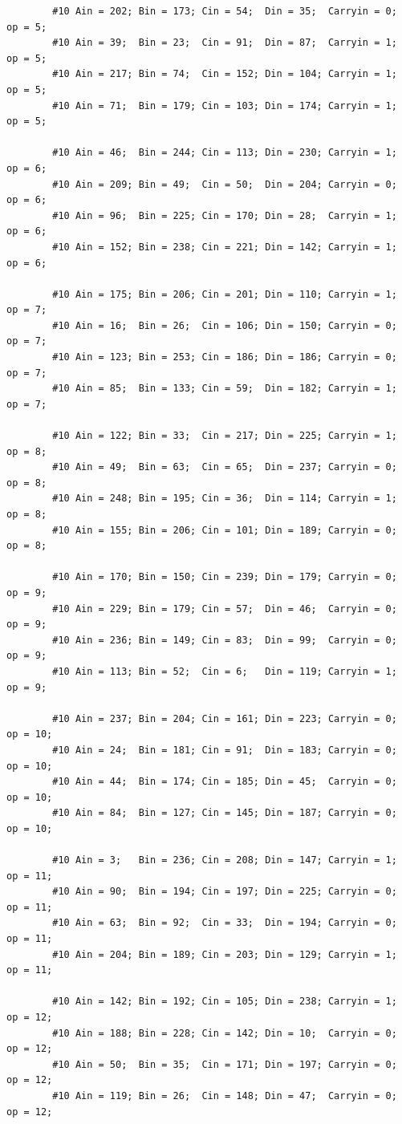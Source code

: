 \documentclass[12pt]{jreport}
\begin{document}
\begin{center}
\begin{lstlisting}
        #10 Ain = 202; Bin = 173; Cin = 54;  Din = 35;  Carryin = 0; op = 5;
        #10 Ain = 39;  Bin = 23;  Cin = 91;  Din = 87;  Carryin = 1; op = 5;
        #10 Ain = 217; Bin = 74;  Cin = 152; Din = 104; Carryin = 1; op = 5;
        #10 Ain = 71;  Bin = 179; Cin = 103; Din = 174; Carryin = 1; op = 5;
  
        #10 Ain = 46;  Bin = 244; Cin = 113; Din = 230; Carryin = 1; op = 6;
        #10 Ain = 209; Bin = 49;  Cin = 50;  Din = 204; Carryin = 0; op = 6;
        #10 Ain = 96;  Bin = 225; Cin = 170; Din = 28;  Carryin = 1; op = 6;
        #10 Ain = 152; Bin = 238; Cin = 221; Din = 142; Carryin = 1; op = 6;
  
        #10 Ain = 175; Bin = 206; Cin = 201; Din = 110; Carryin = 1; op = 7;
        #10 Ain = 16;  Bin = 26;  Cin = 106; Din = 150; Carryin = 0; op = 7;
        #10 Ain = 123; Bin = 253; Cin = 186; Din = 186; Carryin = 0; op = 7;
        #10 Ain = 85;  Bin = 133; Cin = 59;  Din = 182; Carryin = 1; op = 7;
  
        #10 Ain = 122; Bin = 33;  Cin = 217; Din = 225; Carryin = 1; op = 8;
        #10 Ain = 49;  Bin = 63;  Cin = 65;  Din = 237; Carryin = 0; op = 8;
        #10 Ain = 248; Bin = 195; Cin = 36;  Din = 114; Carryin = 1; op = 8;
        #10 Ain = 155; Bin = 206; Cin = 101; Din = 189; Carryin = 0; op = 8;
  
        #10 Ain = 170; Bin = 150; Cin = 239; Din = 179; Carryin = 0; op = 9;
        #10 Ain = 229; Bin = 179; Cin = 57;  Din = 46;  Carryin = 0; op = 9;
        #10 Ain = 236; Bin = 149; Cin = 83;  Din = 99;  Carryin = 0; op = 9;
        #10 Ain = 113; Bin = 52;  Cin = 6;   Din = 119; Carryin = 1; op = 9;
  
        #10 Ain = 237; Bin = 204; Cin = 161; Din = 223; Carryin = 0; op = 10;
        #10 Ain = 24;  Bin = 181; Cin = 91;  Din = 183; Carryin = 0; op = 10;
        #10 Ain = 44;  Bin = 174; Cin = 185; Din = 45;  Carryin = 0; op = 10;
        #10 Ain = 84;  Bin = 127; Cin = 145; Din = 187; Carryin = 0; op = 10;
  
        #10 Ain = 3;   Bin = 236; Cin = 208; Din = 147; Carryin = 1; op = 11;
        #10 Ain = 90;  Bin = 194; Cin = 197; Din = 225; Carryin = 0; op = 11;
        #10 Ain = 63;  Bin = 92;  Cin = 33;  Din = 194; Carryin = 0; op = 11;
        #10 Ain = 204; Bin = 189; Cin = 203; Din = 129; Carryin = 1; op = 11;
  
        #10 Ain = 142; Bin = 192; Cin = 105; Din = 238; Carryin = 1; op = 12;
        #10 Ain = 188; Bin = 228; Cin = 142; Din = 10;  Carryin = 0; op = 12;
        #10 Ain = 50;  Bin = 35;  Cin = 171; Din = 197; Carryin = 0; op = 12;
        #10 Ain = 119; Bin = 26;  Cin = 148; Din = 47;  Carryin = 0; op = 12;
  

\end{lstlisting}
\end{center}
\end{document}
